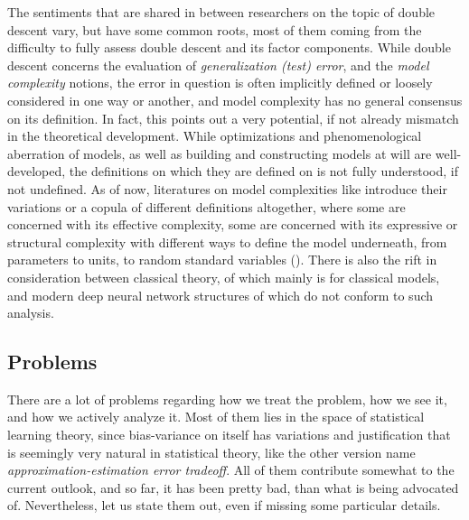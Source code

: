 \documentclass[10pt]{article} %
\begin{document}
The sentiments that are shared in between researchers on the topic of double descent vary, but have some common roots, most of them coming from the difficulty to fully assess double descent and its factor components. While double descent concerns the evaluation of \textit{generalization (test) error}, and the \textit{model complexity} notions, the error in question is often implicitly defined or loosely considered in one way or another, and model complexity has no general consensus on its definition. In fact, this points out a very potential, if not already mismatch in the theoretical development. While optimizations and phenomenological aberration of models, as well as building and constructing models at will are well-developed, the definitions on which they are defined on is not fully understood, if not undefined. As of now, literatures on model complexities like \cite{modelcomplex_exp,hu_model_2021,janik2021complexitydeepneuralnetworks,truong2025rademachercomplexitybasedgeneralizationbounds,luo2024investigatingimpactmodelcomplexity} introduce their variations or a copula of different definitions altogether, where some are concerned with its effective complexity, some are concerned with its expressive or structural complexity with different ways to define the model underneath, from parameters to units, to random standard variables (\cite{neal2018modern}). There is also the rift in consideration between classical theory, of which mainly is for classical models, and modern deep neural network structures of which do not conform to such analysis.

\subsection{Problems}
There are a lot of problems regarding how we treat the problem, how we see it, and how we actively analyze it. Most of them lies in the space of statistical learning theory, since bias-variance on itself has variations and justification that is seemingly very natural in statistical theory, like the other version name \textit{approximation-estimation error tradeoff}. All of them contribute somewhat to the current outlook, and so far, it has been pretty bad, than what is being advocated of. Nevertheless, let us state them out, even if missing some particular details. 
\end{document}
